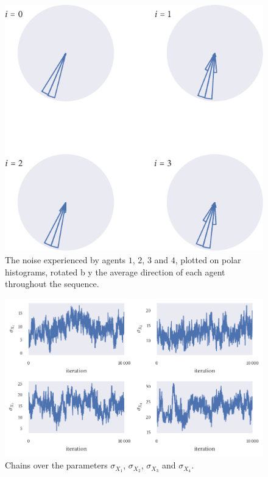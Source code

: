 \begin{figure}[!tbp]
	\includegraphics{output/seq05_polar_noise.pdf}
	\caption{The noise experienced by agents $1$, $2$, $3$ and $4$, plotted on polar histograms, rotated b
y the average direction of each agent throughout the sequence.}
	\label{fig:noise_polar}
\end{figure}
\begin{figure}[!tbp]
	\includegraphics{output/seq05_trace_sigmax.pdf}
	\caption{Chains over the parameters $\sigma_{X_1}$, $\sigma_{X_2}$, $\sigma_{X_3}$ and $\sigma_{X_4}$.
}
	\label{fig:trace_sigmax}
\end{figure}

